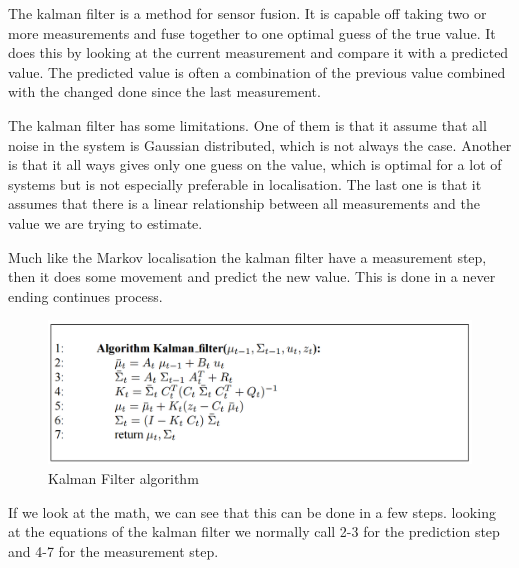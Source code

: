 The kalman filter is a method for sensor fusion. It is capable off taking two or more measurements and fuse together to one optimal guess of the true value. It does this by looking at the current measurement and compare it with a predicted value. The predicted value is often a combination of the previous value combined with the changed done since the last measurement. 

The kalman filter has some limitations. One of them is that it assume that all noise in the system is Gaussian distributed, which is not always the case. Another is that it all ways gives only one guess on the value, which is optimal for a lot of systems but is not especially preferable in localisation. The last one is that it assumes that there is a linear relationship between all measurements and the value we are trying to estimate. 

Much like the Markov localisation the kalman filter have a measurement step, then it does some movement and predict the new value. This is done in a never ending continues process. 
\begin{figure}[H]
\centering
\includegraphics[width=1\textwidth]{billeder/KalmanFilter.png}
\caption{Kalman Filter algorithm}
\label{fig:kalmanfilter}
\end{figure}
If we look at the math, we can see that this can be done in a few steps. looking at the equations of the kalman filter we normally call 2-3 for the prediction step and 4-7 for the measurement step. 
